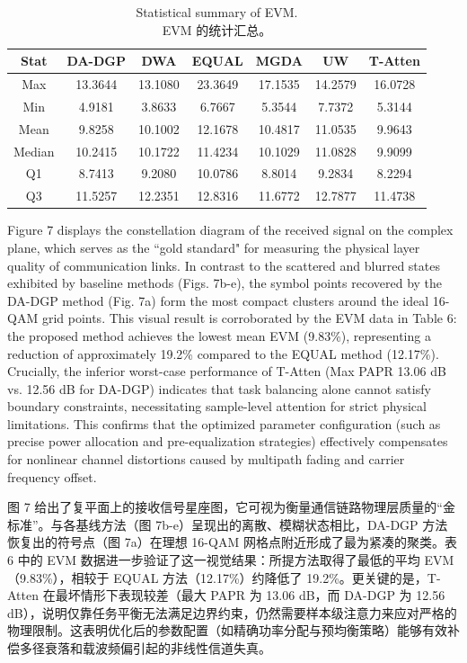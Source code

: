 \documentclass[11pt]{article}
\newcommand{\bicaption}[2]{\caption[#1]{#1\protect\\#2}}
\begin{document}
\begin{table}[!h]
	\centering
	\bicaption{Statistical summary of EVM.}{EVM 的统计汇总。}
	\label{tab:evm_stats}
	\begin{tabular*}{\textwidth}{@{\extracolsep{\fill}}ccccccc}
		\toprule
		\textbf{Stat} & \textbf{DA-DGP} & \textbf{DWA} & \textbf{EQUAL} & \textbf{MGDA} & \textbf{UW} & \textbf{T-Atten} \\
		\midrule
		Max    & 13.3644 & 13.1080 & 23.3649 & 17.1535 & 14.2579 & 16.0728 \\
		Min    & 4.9181  & 3.8633  & 6.7667  & 5.3544  & 7.7372  & 5.3144 \\
		Mean   & 9.8258  & 10.1002 & 12.1678 & 10.4817 & 11.0535 & 9.9643 \\
		Median & 10.2415 & 10.1722 & 11.4234 & 10.1029 & 11.0828 & 9.9099 \\
		Q1     & 8.7413  & 9.2080  & 10.0786 & 8.8014  & 9.2834  & 8.2294 \\
		Q3     & 11.5257 & 12.2351 & 12.8316 & 11.6772 & 12.7877 & 11.4738 \\
		\bottomrule
	\end{tabular*}
\end{table}
\vspace{-0.5em}

Figure 7 displays the constellation diagram of the received signal on the complex plane, which serves as the ``gold standard" for measuring the physical layer quality of communication links. In contrast to the scattered and blurred states exhibited by baseline methods (Figs. 7b-e), the symbol points recovered by the DA-DGP method (Fig. 7a) form the most compact clusters around the ideal 16-QAM grid points. This visual result is corroborated by the EVM data in Table 6: the proposed method achieves the lowest mean EVM (9.83\%), representing a reduction of approximately 19.2\% compared to the EQUAL method (12.17\%). Crucially, the inferior worst-case performance of T-Atten (Max PAPR 13.06 dB vs. 12.56 dB for DA-DGP) indicates that task balancing alone cannot satisfy boundary constraints, necessitating sample-level attention for strict physical limitations. This confirms that the optimized parameter configuration (such as precise power allocation and pre-equalization strategies) effectively compensates for nonlinear channel distortions caused by multipath fading and carrier frequency offset.

图 7 给出了复平面上的接收信号星座图，它可视为衡量通信链路物理层质量的“金标准”。与各基线方法（图 7b-e）呈现出的离散、模糊状态相比，DA-DGP 方法恢复出的符号点（图 7a）在理想 16-QAM 网格点附近形成了最为紧凑的聚类。表 6 中的 EVM 数据进一步验证了这一视觉结果：所提方法取得了最低的平均 EVM（9.83\%），相较于 EQUAL 方法（12.17\%）约降低了 19.2\%。更关键的是，T-Atten 在最坏情形下表现较差（最大 PAPR 为 13.06 dB，而 DA-DGP 为 12.56 dB），说明仅靠任务平衡无法满足边界约束，仍然需要样本级注意力来应对严格的物理限制。这表明优化后的参数配置（如精确功率分配与预均衡策略）能够有效补偿多径衰落和载波频偏引起的非线性信道失真。
\end{document}

